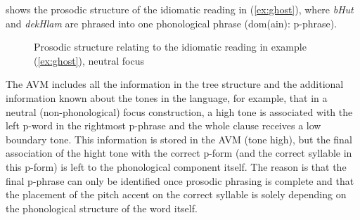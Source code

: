 \documentclass[output=paper,hidelinks]{langscibook}
\begin{document}
\begin{sloppypar}
 shows the prosodic structure of the idiomatic reading in (\ref{ex:ghost}), where {\em bHut} and {\em dekHlam} are phrased into one phonological phrase ({\sc dom(ain): p-phrase}). 
\end{sloppypar}

\begin{figure}
{\small
\begin{center}
\caption{Prosodic structure relating to the idiomatic reading in example (\ref{ex:ghost}), neutral focus}
\label{fig:idio_neut}
\end{center}
}
\end{figure}

The AVM includes all the information in the tree structure and the additional information known about the tones in the language, for example, that in a neutral (non-phonological) focus construction, a 
high tone is associated with the left p-word in the rightmost p-phrase and the whole clause receives a low boundary tone. %
This information is stored in the AVM ({\sc tone high}), but the final association of the hight tone with the correct p-form (and the correct syllable in this p-form) is left to the phonological component itself. The reason is that the final p-phrase %
can only be identified once prosodic phrasing is complete and that the placement of the pitch accent  on the correct syllable is solely depending on the phonological structure of the word itself.
\end{document}
